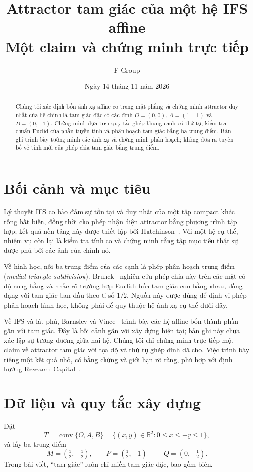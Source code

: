 \documentclass[12pt,a4paper]{article}
\title{\textbf{\sffamily\color{duyblue}Attractor tam giác của một hệ IFS affine}\\[3pt]
\large\sffamily Một claim và chứng minh trực tiếp}
\author{F-Group}
\date{Ngày 14 tháng 11 năm 2026}
\begin{document}
\maketitle
\thispagestyle{fancy}
\begin{abstract}
Chúng tôi xác định bốn ánh xạ affine co trong mặt phẳng và chứng minh attractor duy nhất của hệ chính là tam giác đặc có các đỉnh $O=(0,0)$, $A=(1,-1)$ và $B=(0,-1)$. Chứng minh dựa trên quy tắc ghép khung cạnh có thứ tự, kiểm tra chuẩn Euclid của phần tuyến tính và phân hoạch tam giác bằng ba trung điểm. Bản ghi trình bày tường minh các ánh xạ và chứng minh phân hoạch; không đưa ra tuyên bố về tính mới của phép chia tam giác bằng trung điểm.
\end{abstract}

\section{Bối cảnh và mục tiêu}
Lý thuyết IFS co bảo đảm sự tồn tại và duy nhất của một tập compact khác rỗng bất biến, đồng thời cho phép nhận diện attractor bằng phương trình tập hợp; kết quả nền tảng này được thiết lập bởi Hutchinson~\cite[\S 3.1]{hutchinson1981}. Với một hệ cụ thể, nhiệm vụ còn lại là kiểm tra tính co và chứng minh rằng tập mục tiêu thật sự được phủ bởi các ảnh của chính nó.

Về hình học, nối ba trung điểm của các cạnh là phép phân hoạch trung điểm (\emph{medial triangle subdivision}). Brunck~\cite[\S 1]{brunck2023medial} nghiên cứu phép chia này trên các mặt có độ cong hằng và nhắc rõ trường hợp Euclid: bốn tam giác con bằng nhau, đồng dạng với tam giác ban đầu theo tỉ số $1/2$. Nguồn này được dùng để định vị phép phân hoạch hình học, không phải để quy thuộc hệ ánh xạ cụ thể dưới đây.

Về IFS và lát phủ, Barnsley và Vince~\cite[Ví dụ 3.14, tr.~738--739]{barnsleyvince2014tilings} trình bày các hệ affine bốn thành phần gắn với tam giác. Đây là bối cảnh gần với xây dựng hiện tại; bản ghi này chưa xác lập sự tương đương giữa hai hệ. Chúng tôi chỉ chứng minh trực tiếp một claim về attractor tam giác với tọa độ và thứ tự ghép đỉnh đã cho. Việc trình bày riêng một kết quả nhỏ, có bằng chứng và giới hạn rõ ràng, phù hợp với định hướng Research Capital~\cite{duymt_research_capital,duymt_research_capital_unit}.

\section{Dữ liệu và quy tắc xây dựng}
Đặt
\[
T=\operatorname{conv}\{O,A,B\}
 =\{(x,y)\in\mathbb R^2:0\leq x\leq -y\leq1\},
\]
và lấy ba trung điểm
\[
M=(\tfrac12,-\tfrac12),\qquad
P=(\tfrac12,-1),\qquad Q=(0,-\tfrac12).
\]
Trong bài viết, ``tam giác'' luôn chỉ miền tam giác đặc, bao gồm biên.
\end{document}
